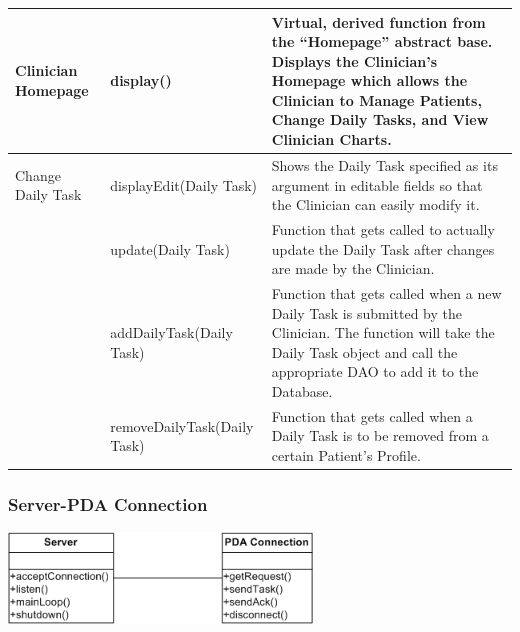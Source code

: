 \documentclass{article}
\begin{document}
\begin{longtable}[t]{|p{1.5in}|p{2in}|p{2.5in}|}
\hline
Clinician Homepage
		& display() & Virtual, derived function from the ``Homepage'' abstract base. Displays the Clinician's Homepage which allows the Clinician to Manage Patients, Change Daily Tasks, and View Clinician Charts.\\
\cline{2-3}

\hline
Change Daily Task
		& displayEdit(Daily Task) & Shows the Daily Task specified as its argument in editable fields so that the Clinician can easily modify it. \\
\cline{2-3}
		& update(Daily Task) & Function that gets called to actually update the Daily Task after changes are made by the Clinician. \\
\cline{2-3}
		& addDailyTask(Daily Task) & Function that gets called when a new Daily Task is submitted by the Clinician. The function will take the Daily Task object and call the appropriate DAO to add it to the Database. \\
\cline{2-3}
		& removeDailyTask(Daily Task) & Function that gets called when a Daily Task is to be removed from a certain Patient's Profile. \\
		
\hline
\end{longtable}


\subsubsection{Server-PDA Connection}

\begin{center}
\includegraphics[width=3.18in,height=0.96in]{Server_PDA_Connection.png}
\end{center}
\end{document}
